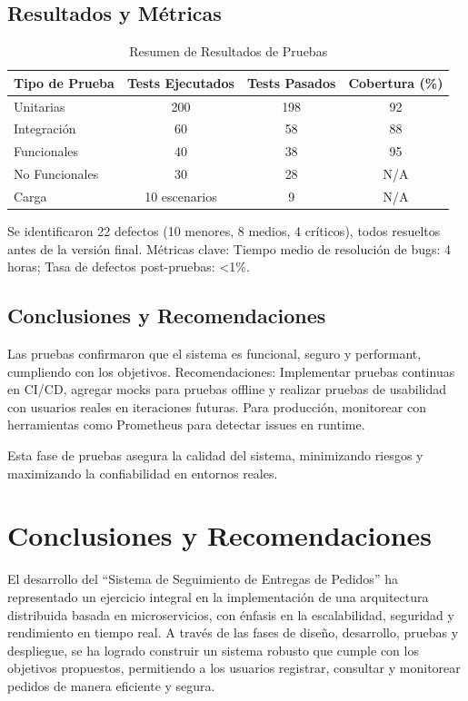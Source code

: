\documentclass[a4paper,12pt]{article}
\begin{document}
\subsection{Resultados y Métricas}
\begin{table}[h]
\centering
\begin{tabular}{|l|c|c|c|}
\hline
Tipo de Prueba & Tests Ejecutados & Tests Pasados & Cobertura (\%) \\
\hline
Unitarias & 200 & 198 & 92 \\
Integración & 60 & 58 & 88 \\
Funcionales & 40 & 38 & 95 \\
No Funcionales & 30 & 28 & N/A \\
Carga & 10 escenarios & 9 & N/A \\
\hline
\end{tabular}
\caption{Resumen de Resultados de Pruebas}
\label{tab:resultados-pruebas}
\end{table}

Se identificaron 22 defectos (10 menores, 8 medios, 4 críticos), todos resueltos antes de la versión final. Métricas clave: Tiempo medio de resolución de bugs: 4 horas; Tasa de defectos post-pruebas: <1\%.

\subsection{Conclusiones y Recomendaciones}
Las pruebas confirmaron que el sistema es funcional, seguro y performant, cumpliendo con los objetivos. Recomendaciones: Implementar pruebas continuas en CI/CD, agregar mocks para pruebas offline y realizar pruebas de usabilidad con usuarios reales en iteraciones futuras. Para producción, monitorear con herramientas como Prometheus para detectar issues en runtime.

Esta fase de pruebas asegura la calidad del sistema, minimizando riesgos y maximizando la confiabilidad en entornos reales.
\section{Conclusiones y Recomendaciones}

El desarrollo del ``Sistema de Seguimiento de Entregas de Pedidos'' ha representado un ejercicio integral en la implementación de una arquitectura distribuida basada en microservicios, con énfasis en la escalabilidad, seguridad y rendimiento en tiempo real. A través de las fases de diseño, desarrollo, pruebas y despliegue, se ha logrado construir un sistema robusto que cumple con los objetivos propuestos, permitiendo a los usuarios registrar, consultar y monitorear pedidos de manera eficiente y segura.
\end{document}
